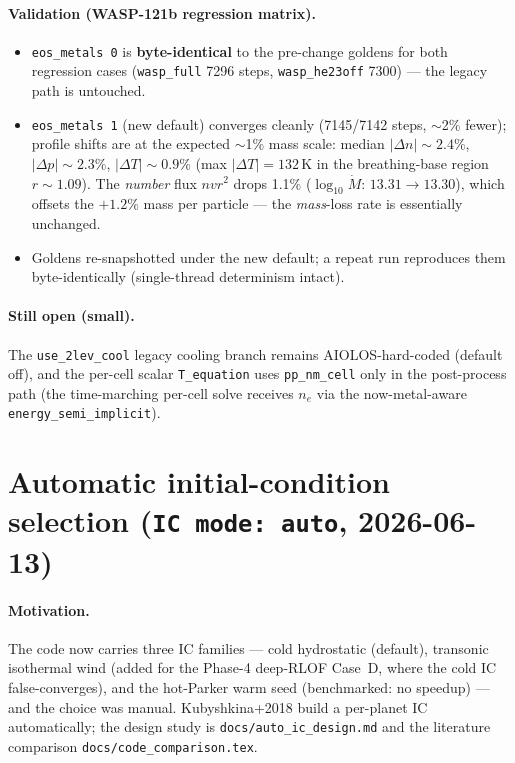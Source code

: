 \documentclass[english,a4paper]{kiseon_memo}
\begin{document}
\paragraph{Validation (WASP-121b regression matrix).}
\begin{itemize}\itemsep1pt
\item \texttt{eos\_metals 0} is \textbf{byte-identical} to the pre-change
  goldens for both regression cases (\texttt{wasp\_full} 7296 steps,
  \texttt{wasp\_he23off} 7300) --- the legacy path is untouched.
\item \texttt{eos\_metals 1} (new default) converges cleanly (7145/7142 steps,
  $\sim$2\% fewer); profile shifts are at the expected $\sim$1\% mass scale:
  median $|\Delta n|\sim2.4\%$, $|\Delta p|\sim2.3\%$, $|\Delta T|\sim0.9\%$
  (max $|\Delta T| = 132$\,K in the breathing-base region $r\sim1.09$). The
  \emph{number} flux $n v r^2$ drops 1.1\%
  ($\log_{10}\dot M$: $13.31\to13.30$), which offsets the $+1.2\%$ mass per
  particle --- the \emph{mass}-loss rate is essentially unchanged.
\item Goldens re-snapshotted under the new default; a repeat run reproduces
  them byte-identically (single-thread determinism intact).
\end{itemize}

\paragraph{Still open (small).} The \texttt{use\_2lev\_cool} legacy cooling
branch remains AIOLOS-hard-coded (default off), and the per-cell scalar
\texttt{T\_equation} uses \texttt{pp\_nm\_cell} only in the post-process path
(the time-marching per-cell solve receives $n_e$ via the now-metal-aware
\texttt{energy\_semi\_implicit}).

\section{Automatic initial-condition selection (\texttt{IC mode: auto}, 2026-06-13)}

\paragraph{Motivation.} The code now carries three IC families --- cold
hydrostatic (default), transonic isothermal wind (added for the Phase-4
deep-RLOF Case~D, where the cold IC false-converges), and the hot-Parker warm
seed (benchmarked: no speedup) --- and the choice was manual. Kubyshkina+2018
build a per-planet IC automatically; the design study is
\texttt{docs/auto\_ic\_design.md} and the literature comparison
\texttt{docs/code\_comparison.tex}.
\end{document}
